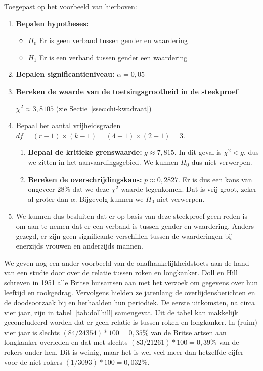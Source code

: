 Toegepast op het voorbeeld van hierboven:

\begin{enumerate}
  \item \textbf{Bepalen hypotheses:}
  \begin{itemize}
    \item $H_0$ Er is geen verband tussen gender en waardering
    \item $H_1$ Er is een verband tussen gender een waardering
  \end{itemize}
  \item \textbf{Bepalen significantieniveau:} $\alpha = 0,05$
  
  \item \textbf{Bereken de waarde van de toetsingsgrootheid in de steekproef}
  
  $\chi^2 \approx 3,8105$ (zie Sectie~\ref{ssec:chi-kwadraat})
  
  \item Bepaal het aantal vrijheidsgraden $df = (r - 1) \times (k - 1) = (4 - 1) \times (2 - 1) = 3$.
  
  \begin{enumerate}
    \item \textbf{Bepaal de kritieke grenswaarde:} $g \approx 7,815$. In dit geval is $\chi^2 < g$, dus we zitten in het aanvaardingsgebied. We kunnen $H_0$ dus niet verwerpen.
    \item \textbf{Bereken de overschrijdingskans:} $p \approx 0,2827$. Er is dus een kans van ongeveer 28\% dat we deze $\chi^2$-waarde tegenkomen. Dat is vrij groot, zeker al groter dan $\alpha$. Bijgevolg kunnen we $H_0$ niet verwerpen.
  \end{enumerate}

  \item We kunnen dus besluiten dat er op basis van deze steekproef geen reden is om aan te nemen dat er een verband is tussen gender en waardering. Anders gezegd, er zijn geen significante verschillen tussen de waarderingen bij enerzijds vrouwen en anderzijds mannen.
\end{enumerate}


We geven nog een ander voorbeeld van de onafhankelijkheidstoets aan de hand van een studie door \textcite{Doll1954} over de relatie tussen roken en longkanker. Doll en Hill schreven in 1951 alle Britse huisartsen aan met het verzoek om gegevens over hun leeftijd en rookgedrag. Vervolgens hielden ze jarenlang de overlijdensberichten en de doodsoorzaak bij en herhaalden hun periodiek. De eerste uitkomsten, na circa vier jaar, zijn in tabel~\ref{tab:dollhill} samengevat. Uit de tabel kan makkelijk geconcludeerd worden dat er geen relatie is tussen roken en longkanker. In (ruim) vier jaar is slechts $(84 / 24354) * 100 = 0,35\%$ van de Britse artsen aan longkanker overleden en dat met slechts $(83 / 21261) * 100 = 0,39\%$ van de rokers onder hen. Dit is weinig, maar het is wel veel meer dan hetzelfde cijfer voor de niet-rokers $(1 / 3093) * 100 = 0,032\%$.

